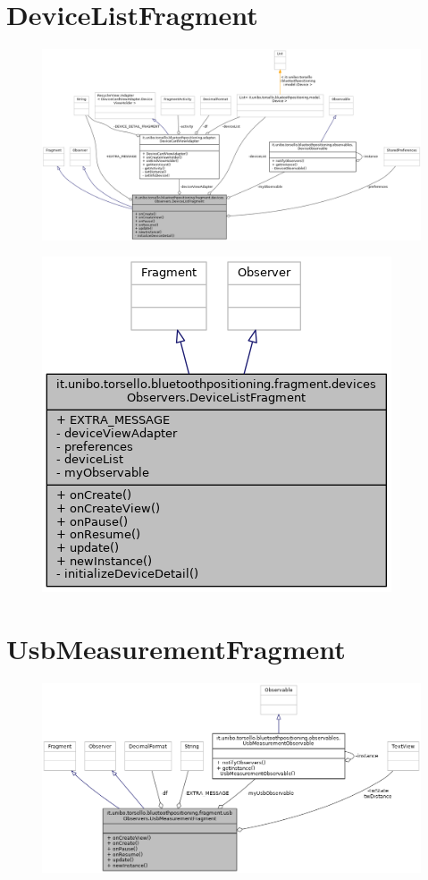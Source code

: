 \newpage
\section{DeviceListFragment}
\begin{figure}[ph]
	\centering
	\includegraphics[width=1.2\linewidth]{img/uml/class/classit_1_1unibo_1_1torsello_1_1bluetoothpositioning_1_1fragment_1_1devicesObservers_1_1DeviceListFragment__coll__graph.png}
	\caption{}
\end{figure}

\begin{figure}[ph]
	\centering
	\includegraphics[width=0.5\linewidth]{img/uml/class/classit_1_1unibo_1_1torsello_1_1bluetoothpositioning_1_1fragment_1_1devicesObservers_1_1DeviceListFragment__inherit__graph.png}
	\caption{}
\end{figure}

\newpage
\section{UsbMeasurementFragment}
\begin{figure}[ph]
	\centering
	\includegraphics[width=1.2\linewidth]{img/uml/class/classit_1_1unibo_1_1torsello_1_1bluetoothpositioning_1_1fragment_1_1usbObservers_1_1UsbMeasurementFragment__coll__graph.png}
	\caption{}
\end{figure}

